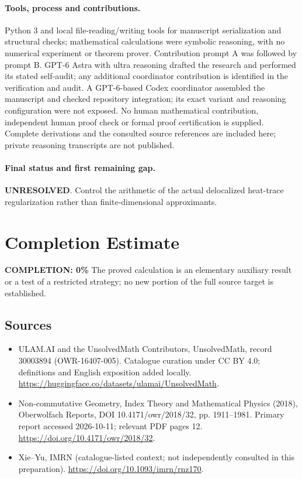 \documentclass[11pt]{article}
\begin{document}
\paragraph{Tools, process and contributions.}
Python 3 and local file-reading/writing tools for manuscript serialization and structural checks; mathematical calculations were symbolic reasoning, with no numerical experiment or theorem prover. Contribution prompt A was followed by prompt B. GPT-6 Astra with ultra reasoning drafted the research and performed its stated self-audit; any additional coordinator contribution is identified in the verification and audit. A GPT-6-based Codex coordinator assembled the manuscript and checked repository integration; its exact variant and reasoning configuration were not exposed. No human mathematical contribution, independent human proof check or formal proof certification is supplied. Complete derivations and the consulted source references are included here; private reasoning transcripts are not published.

\paragraph{Final status and first remaining gap.}
\textbf{UNRESOLVED}. Control the arithmetic of the actual delocalized heat-trace regularization rather than finite-dimensional approximants.

\section{Completion Estimate}
\noindent\textbf{COMPLETION: 0\%}
The proved calculation is an elementary auxiliary result or a test of a restricted strategy; no new portion of the full source target is established.

\subsection{Sources}
\begin{itemize}
\item[\hypertarget{source:30003894:1}{S1}] ULAM.AI and the UnsolvedMath Contributors, UnsolvedMath, record 30003894 (OWR-16407-005). Catalogue curation under CC BY 4.0; definitions and English exposition added locally.
\url{https://huggingface.co/datasets/ulamai/UnsolvedMath}.
\item[\hypertarget{source:30003894:2}{S2}] Non-commutative Geometry, Index Theory and Mathematical Physics (2018), Oberwolfach Reports, DOI 10.4171/owr/2018/32, pp. 1911--1981. Primary report accessed 2026-10-11; relevant PDF pages 12.
\url{https://doi.org/10.4171/owr/2018/32}.
\item[\hypertarget{source:30003894:3}{S3}] Xie--Yu, IMRN (catalogue-listed context; not independently consulted in this preparation).
\url{https://doi.org/10.1093/imrn/rnz170}.
\end{itemize}
\label{end:30003894}
\end{document}
